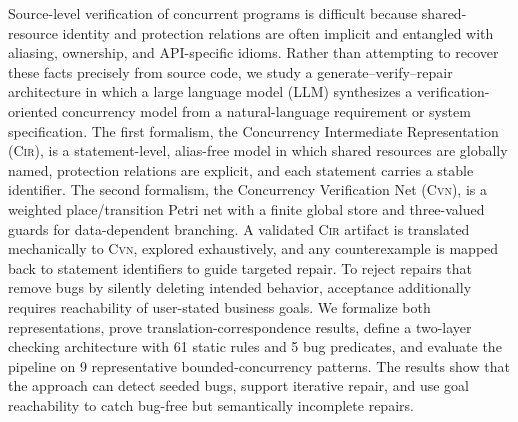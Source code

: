 Source-level verification of concurrent programs is difficult because shared-resource identity and protection relations are often implicit and entangled with aliasing, ownership, and API-specific idioms. Rather than attempting to recover these facts precisely from source code, we study a generate--verify--repair architecture in which a large language model (LLM) synthesizes a verification-oriented concurrency model from a natural-language requirement or system specification. The first formalism, the Concurrency Intermediate Representation (\textsc{Cir}), is a statement-level, alias-free model in which shared resources are globally named, protection relations are explicit, and each statement carries a stable identifier. The second formalism, the Concurrency Verification Net (\textsc{Cvn}), is a weighted place/transition Petri net with a finite global store and three-valued guards for data-dependent branching. A validated \textsc{Cir} artifact is translated mechanically to \textsc{Cvn}, explored exhaustively, and any counterexample is mapped back to statement identifiers to guide targeted repair. To reject repairs that remove bugs by silently deleting intended behavior, acceptance additionally requires reachability of user-stated business goals. We formalize both representations, prove translation-correspondence results, define a two-layer checking architecture with 61 static rules and 5 bug predicates, and evaluate the pipeline on 9 representative bounded-concurrency patterns. The results show that the approach can detect seeded bugs, support iterative repair, and use goal reachability to catch bug-free but semantically incomplete repairs.
